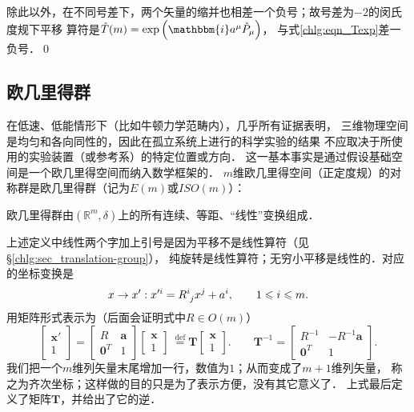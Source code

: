 除此以外，在不同号差下，两个矢量的缩并也相差一个负号；故号差为$-2$的闵氏度规下平移
算符是$\hat{T}(m) = \exp\left(\mathbbm{i} a^\mu \hat{P}_\mu  \right) $，
与式\eqref{chlg:eqn_Texp}差一负号．\qed



\subsection{欧几里得群}\label{chlg:sec_Euclidean-group}
在低速、低能情形下（比如牛顿力学范畴内），几乎所有证据表明，
三维物理空间是均匀和各向同性的，因此在孤立系统上进行的科学实验的结果
不应取决于所使用的实验装置（或参考系）的特定位置或方向．
这一基本事实是通过假设基础空间是一个欧几里得空间而纳入数学框架的．
$m$维欧几里得空间（正定度规）的对称群是欧几里得群（记为$E(m)$或$ISO(m)$）：
\begin{definition}
    欧几里得群由$(\mathbb{R}^m,\delta)$上的所有连续、等距、“线性”变换组成．
\end{definition}
上述定义中线性两个字加上引号是因为平移不是线性算符（见\S\ref{chlg:sec_translation-group}），
纯旋转是线性算符；无穷小平移是线性的．对应的坐标变换是
\begin{equation}\label{chlg:eqn_trans-rot}
    x\to x' : x'^{i} = R^i_{\hphantom{i} j}x^j + a^i ,\qquad  1 \leqslant i \leqslant m .
\end{equation}
用矩阵形式表示为（后面会证明式中$R\in O(m)$）
\begin{equation}\label{chlg:eqn_Em-max}
    \begin{bmatrix}  \boldsymbol{x}' \\ 1 \end{bmatrix} =
    \begin{bmatrix}  R & \boldsymbol{a} \\ \boldsymbol{0}^T & 1  \end{bmatrix}
    \begin{bmatrix}  \boldsymbol{x} \\ 1 \end{bmatrix} 
    \  \overset{\mathrm {def}}{=} \boldsymbol{T} \begin{bmatrix}  \boldsymbol{x} \\ 1 \end{bmatrix} .
    \qquad \boldsymbol{T}^{-1} = 
    \begin{bmatrix}    R^{-1} & -R^{-1} \boldsymbol{a} \\ \boldsymbol{0}^T & 1    \end{bmatrix} .
\end{equation}
我们把一个$m$维列矢量末尾增加一行，数值为$1$；从而变成了$m+1$维列矢量，
称之为{\heiti 齐次坐标}；这样做的目的只是为了表示方便，没有其它意义了．
上式最后定义了矩阵$\boldsymbol{T}$，并给出了它的逆．

